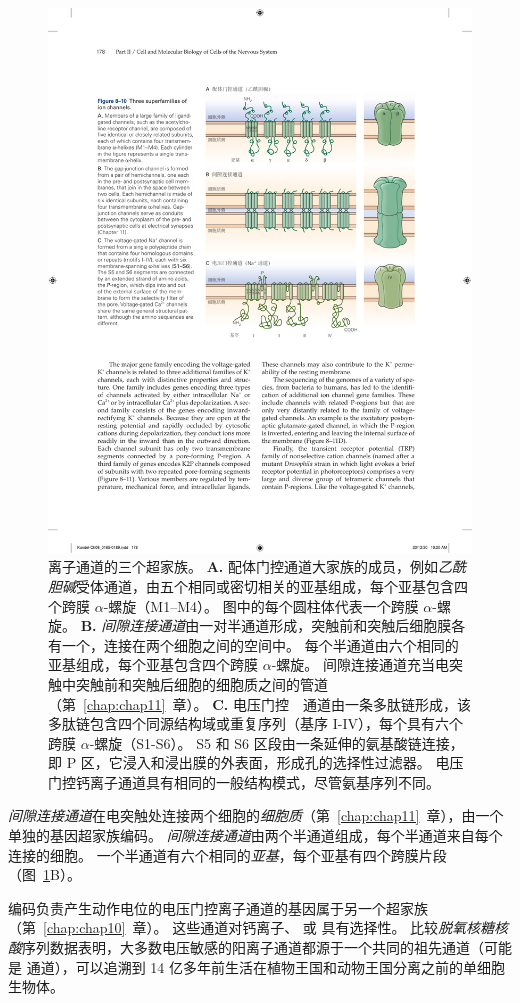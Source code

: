\begin{figure}[htbp]
	\centering
	\includegraphics[width=0.75\linewidth]{chap08/fig_8_10}
	\caption{离子通道的三个超家族。 
		\textbf{A.} 配体门控通道大家族的成员，例如\textit{乙酰胆碱}受体通道，由五个相同或密切相关的亚基组成，每个亚基包含四个跨膜 $\alpha$-螺旋（M1–M4）。
		图中的每个圆柱体代表一个跨膜 $\alpha$-螺旋。
		\textbf{B.} \textit{间隙连接通道}由一对半通道形成，突触前和突触后细胞膜各有一个，连接在两个细胞之间的空间中。
		每个半通道由六个相同的亚基组成，每个亚基包含四个跨膜 $\alpha$-螺旋。
		间隙连接通道充当电突触中突触前和突触后细胞的细胞质之间的管道（第~\ref{chap:chap11}~章）。
		\textbf{C.} 电压门控~~通道由一条多肽链形成，该多肽链包含四个同源结构域或重复序列（基序 I-IV），每个具有六个跨膜 $\alpha$-螺旋（S1-S6）。
		S5 和 S6 区段由一条延伸的氨基酸链连接，即 P 区，它浸入和浸出膜的外表面，形成孔的选择性过滤器。
		电压门控钙离子通道具有相同的一般结构模式，尽管氨基序列不同。}
	\label{fig:8_10}
\end{figure}




\textit{间隙连接通道}在电突触处连接两个细胞的\textit{细胞质}（第~\ref{chap:chap11}~章），由一个单独的基因超家族编码。
\textit{间隙连接通道}由两个半通道组成，每个半通道来自每个连接的细胞。
一个半通道有六个相同的\textit{亚基}，每个亚基有四个跨膜片段（图~\ref{fig:8_10}B）。


编码负责产生动作电位的电压门控离子通道的基因属于另一个超家族（第~\ref{chap:chap10}~章）。
这些通道对钙离子、 或  具有选择性。
比较\textit{脱氧核糖核酸}序列数据表明，大多数电压敏感的阳离子通道都源于一个共同的祖先通道（可能是  通道），可以追溯到 14 亿多年前生活在植物王国和动物王国分离之前的单细胞生物体。


